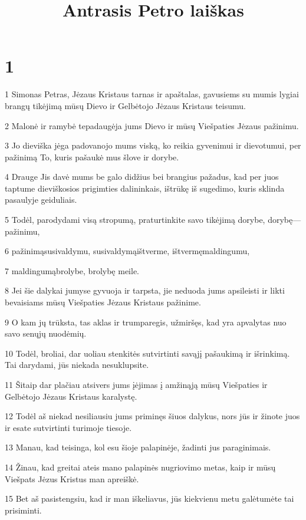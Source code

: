 

\title{Antrasis Petro laiškas}


\chapter{1}


\par 1 Simonas Petras, Jėzaus Kristaus tarnas ir apaštalas, gavusiems su mumis lygiai brangų tikėjimą mūsų Dievo ir Gelbėtojo Jėzaus Kristaus teisumu. 
\par 2 Malonė ir ramybė tepadaugėja jums Dievo ir mūsų Viešpaties Jėzaus pažinimu. 
\par 3 Jo dieviška jėga padovanojo mums viską, ko reikia gyvenimui ir dievotumui, per pažinimą To, kuris pašaukė mus šlove ir dorybe. 
\par 4 Drauge Jis davė mums be galo didžius bei brangius pažadus, kad per juos taptume dieviškosios prigimties dalininkais, ištrūkę iš sugedimo, kuris sklinda pasaulyje geiduliais. 
\par 5 Todėl, parodydami visą stropumą, praturtinkite savo tikėjimą dorybe, dorybę—pažinimu, 
\par 6 pažinimą­susivaldymu, susivaldymą­ištverme, ištvermę­maldingumu, 
\par 7 maldingumą­brolybe, brolybę­ meile. 
\par 8 Jei šie dalykai jumyse gyvuoja ir tarpsta, jie neduoda jums apsileisti ir likti bevaisiams mūsų Viešpaties Jėzaus Kristaus pažinime. 
\par 9 O kam jų trūksta, tas aklas ir trumparegis, užmiršęs, kad yra apvalytas nuo savo senųjų nuodėmių. 
\par 10 Todėl, broliai, dar uoliau stenkitės sutvirtinti savąjį pašaukimą ir išrinkimą. Tai darydami, jūs niekada nesuklupsite. 
\par 11 Šitaip dar plačiau atsivers jums įėjimas į amžinąją mūsų Viešpaties ir Gelbėtojo Jėzaus Kristaus karalystę. 
\par 12 Todėl aš niekad nesiliausiu jums priminęs šiuos dalykus, nors jūs ir žinote juos ir esate sutvirtinti turimoje tiesoje. 
\par 13 Manau, kad teisinga, kol esu šioje palapinėje, žadinti jus paraginimais. 
\par 14 Žinau, kad greitai ateis mano palapinės nugriovimo metas, kaip ir mūsų Viešpats Jėzus Kristus man apreiškė. 
\par 15 Bet aš pasistengsiu, kad ir man iškeliavus, jūs kiekvienu metu galėtumėte tai prisiminti. 
